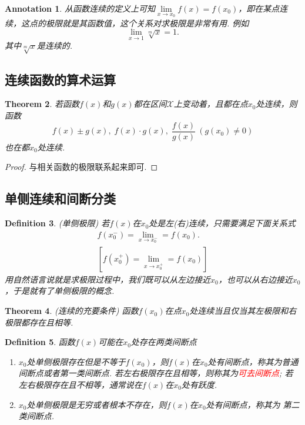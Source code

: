 \documentclass{article}
\newtheorem{theorem}{Theorem}[section]
\newtheorem{definition}[theorem]{Definition}
\newtheorem{annotation}[theorem]{Annotation}
\newcommand{\redt}[1]{\textcolor{red}{#1}}
\begin{document}
\begin{annotation}
\rm 从函数连续的定义上可知$\lim\limits_{x \rightarrow x_0}f(x) = f(x_0)$，即在某点连续，这点的极限就是其函数值，这个关系对求极限是非常有用. 例如
$$
\lim\limits_{x \rightarrow 1} \sqrt[m]{x} = 1.
$$
其中$\sqrt[m]{x}$是连续的.
\end{annotation}


\subsection{连续函数的算术运算}

\begin{theorem}
\rm 若函数$f(x)$和$g(x)$都在区间$\mathcal{X}$上变动着，且都在点$x_0$处连续，则函数
$$
f(x) \pm g(x),\; f(x)\cdot g(x), \; \frac{f(x)}{g(x)}~(g(x_0) \neq 0)
$$
也在都$x_0$处连续.
\end{theorem}

\begin{proof}
{\color{blue}与相关函数的极限联系起来即可}.
\end{proof}

\subsection{单侧连续和间断分类}

\begin{definition}
\rm {\color{red} (单侧极限) }若$f(x)$在$x_0$处是左(右)连续，只需要满足下面关系式
$$
\begin{array}{ll}
f(x_0^-) = \lim\limits_{x \rightarrow x_0^-} = f(x_0). \\
\left[ f(x_0^+) = \lim\limits_{x \rightarrow x_0^+} = f(x_0) \right]
\end{array}
$$
{\color{blue}用自然语言说就是求极限过程中，我们既可以从左边接近$x_0$，也可以从右边接近$x_0$，于是就有了单侧极限的概念}.
\end{definition}

\begin{theorem}
\rm {\color{red} (连续的充要条件)} 函数$f(x_0)$在点$x_0$处连续当且仅当其左极限和右极限都存在且相等.
\end{theorem}

\begin{definition}
\rm 函数$f(x)$可能在$x_0$处存在两类间断点
\begin{enumerate}
	\item $x_0$处单侧极限存在但是不等于$f(x_0)$，则$f(x)$在$x_0$处有间断点，称其为{\color{red}普通间断点}或者{\color{red}第一类间断点}. 若左右极限存在且相等，则称其为\redt{可去间断点}; 若左右极限存在且不相等，通常说在$f(x)$在$x_0$处有{\color{red}跃度}. 
	\item $x_0$处单侧极限是无穷或者根本不存在，则$f(x)$在$x_0$处有间断点，称其为{\color{red} 第二类间断点}.
\end{enumerate}
\end{definition}
\end{document}
